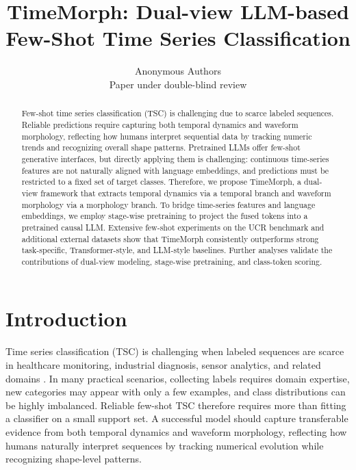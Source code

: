 \documentclass{article}
\title{TimeMorph: Dual-view LLM-based Few-Shot Time Series Classification}
\author{%
  Anonymous Authors\\
  Paper under double-blind review
}
\begin{document}
\maketitle

\begin{abstract}
  Few-shot time series classification (TSC) is challenging due to scarce labeled sequences. Reliable predictions require capturing both temporal dynamics and waveform morphology, reflecting how humans interpret sequential data by tracking numeric trends and recognizing overall shape patterns. Pretrained LLMs offer few-shot generative interfaces, but directly applying them is challenging: continuous time-series features are not naturally aligned with language embeddings, and predictions must be restricted to a fixed set of target classes. Therefore, we propose TimeMorph, a dual-view framework that extracts temporal dynamics via a temporal branch and waveform morphology via a morphology branch. To bridge time-series features and language embeddings, we employ stage-wise pretraining to project the fused tokens into a pretrained causal LLM. Extensive few-shot experiments on the UCR benchmark and additional external datasets show that TimeMorph consistently outperforms strong task-specific, Transformer-style, and LLM-style baselines. Further analyses validate the contributions of dual-view modeling, stage-wise pretraining, and class-token scoring.
\end{abstract}

\section{Introduction}

Time series classification (TSC) is challenging when labeled sequences are scarce in healthcare monitoring, industrial diagnosis, sensor analytics, and related domains \citep{ismail2019deep}. In many practical scenarios, collecting labels requires domain expertise, new categories may appear with only a few examples, and class distributions can be highly imbalanced. Reliable few-shot TSC therefore requires more than fitting a classifier on a small support set. A successful model should capture transferable evidence from both temporal dynamics and waveform morphology, reflecting how humans naturally interpret sequences by tracking numerical evolution while recognizing shape-level patterns.
\end{document}
